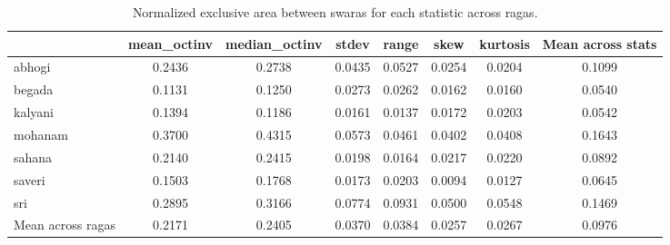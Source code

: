 \begin{table}
\caption{Normalized exclusive area between swaras for each statistic across ragas.}
\label{tab:exclusive_area}
\begin{tabular}{lccccccc}
\toprule
 & mean_octinv & median_octinv & stdev & range & skew & kurtosis & Mean across stats \\
\midrule
abhogi & 0.2436 & 0.2738 & 0.0435 & 0.0527 & 0.0254 & 0.0204 & 0.1099 \\
begada & 0.1131 & 0.1250 & 0.0273 & 0.0262 & 0.0162 & 0.0160 & 0.0540 \\
kalyani & 0.1394 & 0.1186 & 0.0161 & 0.0137 & 0.0172 & 0.0203 & 0.0542 \\
mohanam & 0.3700 & 0.4315 & 0.0573 & 0.0461 & 0.0402 & 0.0408 & 0.1643 \\
sahana & 0.2140 & 0.2415 & 0.0198 & 0.0164 & 0.0217 & 0.0220 & 0.0892 \\
saveri & 0.1503 & 0.1768 & 0.0173 & 0.0203 & 0.0094 & 0.0127 & 0.0645 \\
sri & 0.2895 & 0.3166 & 0.0774 & 0.0931 & 0.0500 & 0.0548 & 0.1469 \\
Mean across ragas & 0.2171 & 0.2405 & 0.0370 & 0.0384 & 0.0257 & 0.0267 & 0.0976 \\
\bottomrule
\end{tabular}
\end{table}

